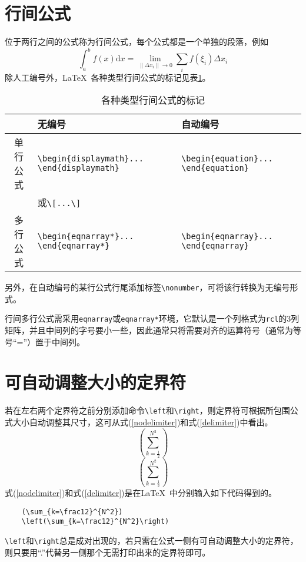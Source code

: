 \section{行间公式}
位于两行之间的公式称为行间公式，每个公式都是一个单独的段落，例如
\[\int_a^b{f\left(x\right)\mathrm{d}x}=\lim_{\left\|\Delta{x_i}\right\|\to 0}\sum_i{f\left(\xi_i\right)\Delta{x_i}}\]
除人工编号外，\LaTeX~各种类型行间公式的标记见表\ref{tab:eqtag}。
\begin{table}[htbp]
	\caption{各种类型行间公式的标记}\label{tab:eqtag}
	\vspace{0.5em}\centering{}
	\begin{tabularx}{\textwidth}{cll}
		\toprule
		         & 无编号                     & 自动编号                \\
		\midrule
		单行公式 & \verb|\begin{displaymath}... \end{displaymath}|    & \verb|\begin{equation}... \end{equation}| \\
		         & 或\verb|\[...\]| &                         \\
		多行公式 & \verb|\begin{eqnarray*}... \end{eqnarray*}|    & \verb|\begin{eqnarray}... \end{eqnarray}| \\
		\bottomrule
	\end{tabularx}
\end{table}

另外，在自动编号的某行公式行尾添加标签\verb|\nonumber|，可将该行转换为无编号形式。

行间多行公式需采用\verb|eqnarray|或\verb|eqnarray*|环境，它默认是一个列格式为\verb|rcl|的3列矩阵，并且中间列的字号要小一些，因此通常只将需要对齐的运算符号（通常为等号“=”）置于中间列。

\section{可自动调整大小的定界符}
若在左右两个定界符之前分别添加命令\verb|\left|和\verb|\right|，则定界符可根据所包围公式大小自动调整其尺寸，这可从式(\ref{nodelimiter})和式(\ref{delimiter})中看出。
\begin{equation}\label{nodelimiter}
	(\sum_{k=\frac12}^{N^2})
\end{equation}
\begin{equation}\label{delimiter}
	\left(\sum_{k=\frac12}^{N^2}\right)
\end{equation}
式(\ref{nodelimiter})和式(\ref{delimiter})是在\LaTeX~中分别输入如下代码得到的。
\begin{verbatim}
	(\sum_{k=\frac12}^{N^2})
	\left(\sum_{k=\frac12}^{N^2}\right)
\end{verbatim}
\verb|\left|和\verb|\right|总是成对出现的，若只需在公式一侧有可自动调整大小的定界符，则只要用“.”代替另一侧那个无需打印出来的定界符即可。

